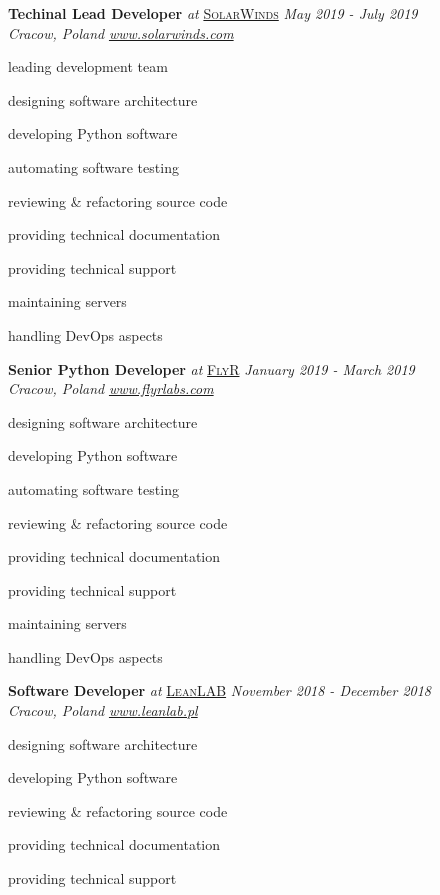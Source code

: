 \documentclass[10pt]{article}
\newenvironment{innerlist}[1][\enskip\textbullet]%
        {\begin{compactitem}[#1]}{\end{compactitem}}
\begin{document}
\textbf{Techinal Lead Developer} \textit{at} \href{https://www.solarwinds.com}{\textsc{SolarWinds}} \hfill \textit{May 2019 - July 2019} \\
\textit{Cracow, Poland} 
\hfill \href{https://www.solarwinds.com}{\textit{www.solarwinds.com}}
\vspace{0.1in}
\begin{innerlist}
\item leading development team
\item designing software architecture
\item developing Python software
\item automating software testing
\item reviewing & refactoring source code
\item providing technical documentation
\item providing technical support
\item maintaining servers
\item handling DevOps aspects
\end{innerlist}

\vspace{0.30in}

\textbf{Senior Python Developer} \textit{at} \href{https://www.flyrlabs.com}{\textsc{FlyR}} \hfill \textit{January 2019 - March 2019} \\
\textit{Cracow, Poland}
\hfill \href{https://www.flyrlabs.com}{\textit{www.flyrlabs.com}}
\vspace{0.1in}
\begin{innerlist}
\item designing software architecture
\item developing Python software
\item automating software testing
\item reviewing & refactoring source code
\item providing technical documentation
\item providing technical support
\item maintaining servers
\item handling DevOps aspects
\end{innerlist}

\vspace{0.30in}

\textbf{Software Developer} \textit{at} \href{https://www.leanlab.pl/}{\textsc{LeanLAB}} \hfill \textit{November 2018 - December 2018} \\
\textit{Cracow, Poland} 
\hfill \href{https://www.leanlab.pl/}{\textit{www.leanlab.pl}} 
\vspace{0.1in}
\begin{innerlist}
\item designing software architecture
\item developing Python software
\item reviewing \& refactoring source code
\item providing technical documentation 
\item providing technical support
\end{innerlist}
\end{document}
